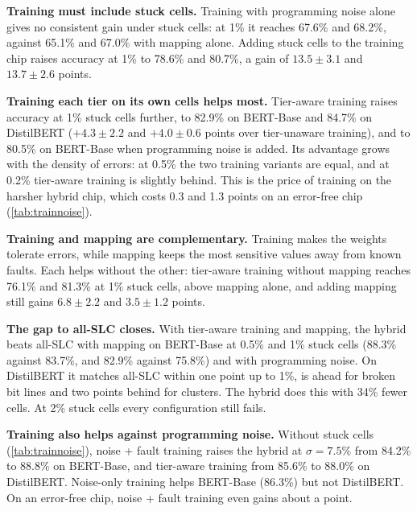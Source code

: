 \textbf{Training must include stuck cells.} Training with programming noise alone gives no consistent gain
under stuck cells: at 1\% it reaches 67.6\% and 68.2\%, against 65.1\% and 67.0\% with mapping alone.
Adding stuck cells to the training chip raises accuracy at 1\% to 78.6\% and 80.7\%, a gain of
$13.5\pm3.1$ and $13.7\pm2.6$ points.

\textbf{Training each tier on its own cells helps most.} Tier-aware training raises accuracy at 1\% stuck
cells further, to 82.9\% on BERT-Base and 84.7\% on DistilBERT ($+4.3\pm2.2$ and $+4.0\pm0.6$ points over
tier-unaware training), and to 80.5\% on BERT-Base when programming noise is added. Its advantage grows
with the density of errors: at 0.5\% the two training variants are equal, and at 0.2\% tier-aware training
is slightly behind. This is the price of training on the harsher hybrid chip, which costs 0.3 and 1.3
points on an error-free chip (\cref{tab:trainnoise}).

\textbf{Training and mapping are complementary.} Training makes the weights tolerate errors, while mapping
keeps the most sensitive values away from known faults. Each helps without the other: tier-aware training
without mapping reaches 76.1\% and 81.3\% at 1\% stuck cells, above mapping alone, and adding mapping still
gains $6.8\pm2.2$ and $3.5\pm1.2$ points.

\textbf{The gap to all-SLC closes.} With tier-aware training and mapping, the hybrid beats all-SLC with
mapping on BERT-Base at 0.5\% and 1\% stuck cells (88.3\% against 83.7\%, and 82.9\% against 75.8\%) and
with programming noise. On DistilBERT it matches all-SLC within one point up to 1\%, is ahead for broken bit
lines and two points behind for clusters. The hybrid does this with 34\% fewer cells. At 2\% stuck cells
every configuration still fails.

\textbf{Training also helps against programming noise.} Without stuck cells (\cref{tab:trainnoise}),
noise + fault training raises the hybrid at $\sigma=7.5\%$ from 84.2\% to 88.8\% on BERT-Base, and
tier-aware training from 85.6\% to 88.0\% on DistilBERT. Noise-only training helps BERT-Base (86.3\%) but
not DistilBERT. On an error-free chip, noise + fault training even gains about a point.

